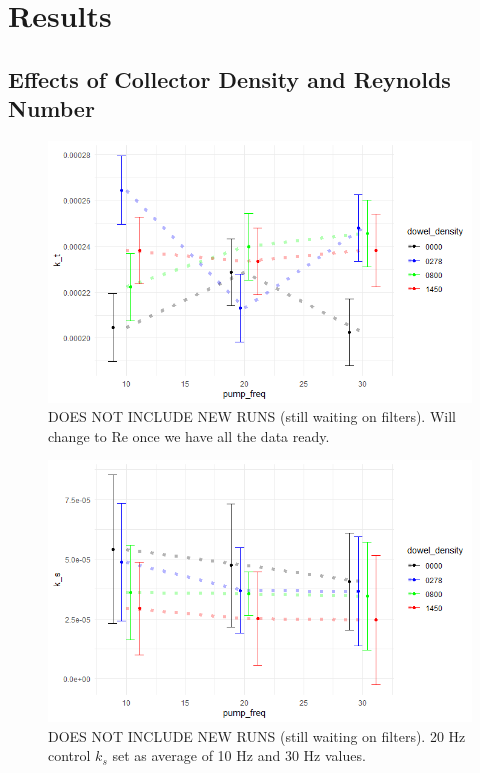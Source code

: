\documentclass{article}
\begin{document}
\section{Results}

\subsection{Effects of Collector Density and Reynolds Number}

\begin{figure}[H]
    \centering
    \includegraphics[width=5in]{../pics/k_t.png}
    \caption{DOES NOT INCLUDE NEW RUNS (still waiting on filters). Will change to Re once we have all the data ready.}
    \label{fig:k_t}
\end{figure}

\begin{figure}[H]
    \centering
    \includegraphics[width=5in]{pics/k_s.png}
    \caption{DOES NOT INCLUDE NEW RUNS (still waiting on filters). 20 Hz control $k_s$ set as average of 10 Hz and 30 Hz values.}
    \label{fig:k_s}
\end{figure}
\end{document}
